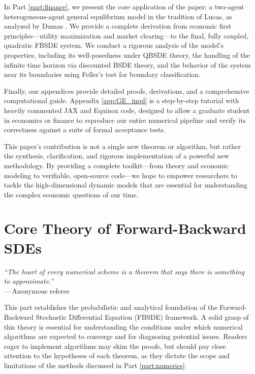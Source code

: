 In Part \ref{part:finance}, we present the core application of the paper: a two-agent heterogeneous-agent general equilibrium model in the tradition of Lucas, as analyzed by Dumas \cite{Dumas1989}. We provide a complete derivation from economic first principles—utility maximization and market clearing—to the final, fully coupled, quadratic FBSDE system. We conduct a rigorous analysis of the model's properties, including its well-posedness under QBSDE theory, the handling of the infinite time horizon via discounted BSDE theory, and the behavior of the system near its boundaries using Feller's test for boundary classification.

Finally, our appendices provide detailed proofs, derivations, and a comprehensive computational guide. Appendix \ref{app:GE_impl} is a step-by-step tutorial with heavily commented JAX and Equinox code, designed to allow a graduate student in economics or finance to reproduce our entire numerical pipeline and verify its correctness against a suite of formal acceptance tests.

This paper's contribution is not a single new theorem or algorithm, but rather the synthesis, clarification, and rigorous implementation of a powerful new methodology. By providing a complete toolkit—from theory and economic modeling to verifiable, open-source code—we hope to empower researchers to tackle the high-dimensional dynamic models that are essential for understanding the complex economic questions of our time.

\part{Core Theory of Forward-Backward SDEs}
\label{part:core_theory}

\begin{center}
\textit{``The heart of every numerical scheme is a theorem that says
there \emph{is} something to approximate.''}\\[4pt]
—\,Anonymous referee
\end{center}

This part establishes the probabilistic and analytical foundation of the Forward-Backward Stochastic Differential Equation (FBSDE) framework. A solid grasp of this theory is essential for understanding the conditions under which numerical algorithms are expected to converge and for diagnosing potential issues. Readers eager to implement algorithms may skim the proofs, but should pay close attention to the hypotheses of each theorem, as they dictate the scope and limitations of the methods discussed in Part \ref{part:numerics}.
 
